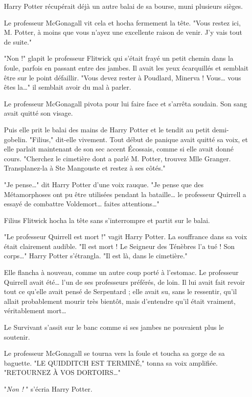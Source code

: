 Harry Potter récupérait déjà un autre balai de sa bourse, muni plusieurs sièges.

Le professeur McGonagall vit cela et hocha fermement la tête. "Vous restez ici, M. Potter, à moins que vous n'ayez une excellente raison de venir. J'y vais tout de suite."

"Non !" glapit le professeur Flitwick qui s'était frayé un petit chemin dans la foule, parfois en passant entre des jambes. Il avait les yeux écarquillés et semblait être sur le point défaillir. "Vous devez rester à Poudlard, Minerva ! Vous… vous êtes la…" il semblait avoir du mal à parler.

Le professeur McGonagall pivota pour lui faire face et s'arrêta soudain. Son sang avait quitté son visage.

Puis elle prit le balai des mains de Harry Potter et le tendit au petit demi-gobelin. "Filius," dit-elle vivement. Tout début de panique avait quitté sa voix, et elle parlait maintenant de son sec accent Écossais, comme si elle avait donné cours. "Cherchez le cimetière dont a parlé M. Potter, trouvez Mlle Granger. Transplanez-la à Ste Mangouste et restez à ses côtés."

"Je pense…" dit Harry Potter d'une voix rauque. "Je pense que des Métamorphoses ont pu être utilisées pendant la bataille… le professeur Quirrell a essayé de combattre Voldemort… faites attentions…"

Filius Flitwick hocha la tête sans s'interrompre et partit sur le balai.

"Le professeur Quirrell est mort !" vagit Harry Potter. La souffrance dans sa voix était clairement audible. "Il est mort ! Le Seigneur des Ténèbres l'a tué ! Son corps…" Harry Potter s'étrangla. "Il est là, dans le cimetière."

Elle flancha à nouveau, comme un autre coup porté à l'estomac. Le professeur Quirrell avait été… l'un de ses professeurs préférés, de loin. Il lui avait fait revoir tout ce qu'elle avait pensé de Serpentard ; elle avait su, sans le ressentir, qu'il allait probablement mourir très bientôt, mais d'entendre qu'il était vraiment, véritablement mort…

Le Survivant s'assit sur le banc comme si ses jambes ne pouvaient plus le soutenir.

Le professeur McGonagall se tourna vers la foule et toucha sa gorge de sa baguette. "LE QUIDDITCH EST TERMINÉ," tonna sa voix amplifiée. "RETOURNEZ À VOS DORTOIRS…"

"\emph{Non !} " s'écria Harry Potter.

